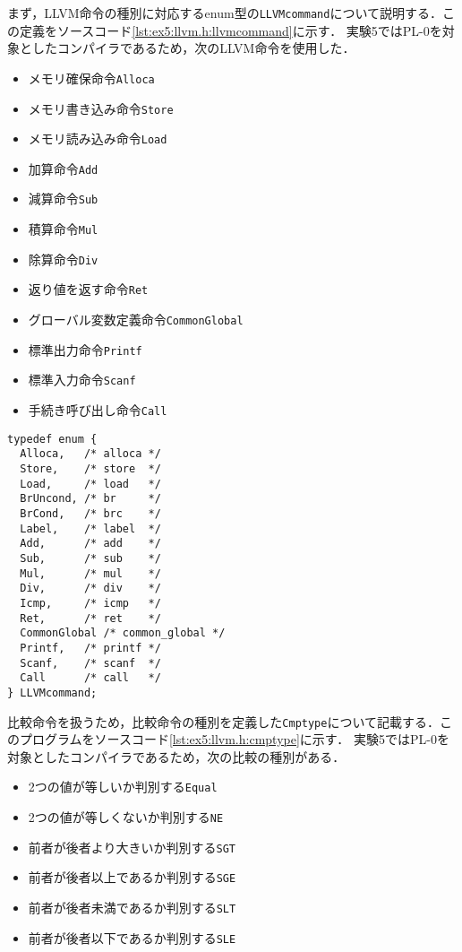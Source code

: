 \documentclass[uplatex]{jsarticle}
\begin{document}
まず，LLVM命令の種別に対応するenum型の\verb#LLVMcommand#について説明する．この定義をソースコード\ref{lst:ex5:llvm.h:llvmcommand}に示す．
実験5ではPL-0を対象としたコンパイラであるため，次のLLVM命令を使用した．
\begin{itemize}
  \item {メモリ確保命令\verb#Alloca#}
  \item {メモリ書き込み命令\verb#Store#}
  \item {メモリ読み込み命令\verb#Load#}
  \item {加算命令\verb#Add#}
  \item {減算命令\verb#Sub#}
  \item {積算命令\verb#Mul#}
  \item {除算命令\verb#Div#}
  \item {返り値を返す命令\verb#Ret#}
  \item {グローバル変数定義命令\verb#CommonGlobal#}
  \item {標準出力命令\verb#Printf#}
  \item {標準入力命令\verb#Scanf#}
  \item {手続き呼び出し命令\verb#Call#}
\end{itemize}
\begin{lstlisting}[caption=LLVMコマンドを表す列挙型LLVMcommand,label=lst:ex5:llvm.h:llvmcommand]
typedef enum {
  Alloca,   /* alloca */
  Store,    /* store  */
  Load,     /* load   */
  BrUncond, /* br     */
  BrCond,   /* brc    */
  Label,    /* label  */
  Add,      /* add    */
  Sub,      /* sub    */
  Mul,      /* mul    */
  Div,      /* div    */
  Icmp,     /* icmp   */
  Ret,      /* ret    */
  CommonGlobal /* common_global */
  Printf,   /* printf */
  Scanf,    /* scanf  */
  Call      /* call   */
} LLVMcommand;
\end{lstlisting}

比較命令を扱うため，比較命令の種別を定義した\verb#Cmptype#について記載する．このプログラムをソースコード\ref{lst:ex5:llvm.h:cmptype}に示す．
実験5ではPL-0を対象としたコンパイラであるため，次の比較の種別がある．
\begin{itemize}
  \item {2つの値が等しいか判別する\verb#Equal#}
  \item {2つの値が等しくないか判別する\verb#NE#}
  \item {前者が後者より大きいか判別する\verb#SGT#}
  \item {前者が後者以上であるか判別する\verb#SGE#}
  \item {前者が後者未満であるか判別する\verb#SLT#}
  \item {前者が後者以下であるか判別する\verb#SLE#}
\end{itemize}
\end{document}
